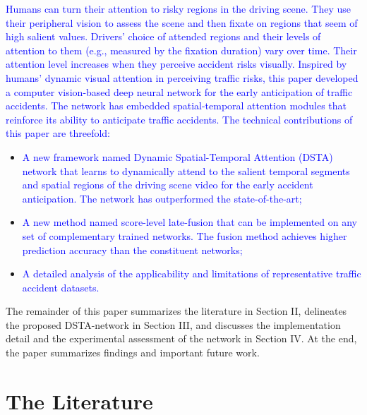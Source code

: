 \documentclass[journal]{IEEEtran}
\begin{document}
\textcolor{blue}{
Humans can turn their attention to risky regions in the driving scene. They use their peripheral vision to assess the scene and then fixate on regions that seem of high salient values. Drivers’ choice of attended regions and their levels of attention to them (e.g., measured by the fixation duration) vary over time. Their attention level increases when they perceive accident risks visually. Inspired by humans’ dynamic visual attention in perceiving traffic risks, this paper developed a computer vision-based deep neural network for the early anticipation of traffic accidents. The network has embedded spatial-temporal attention modules that reinforce its ability to anticipate traffic accidents. The technical contributions of this paper are threefold:}
\begin{itemize}
    \item \textcolor{blue}{A new framework named Dynamic Spatial-Temporal Attention (DSTA) network that learns to dynamically attend to the salient temporal segments and spatial regions of the driving scene video for the early accident anticipation. The network has outperformed the state-of-the-art;}
    \item \textcolor{blue}{A new method named score-level late-fusion that can be implemented on any set of complementary trained networks. The fusion method achieves higher prediction accuracy than the constituent networks;
    }
    \item \textcolor{blue}{A detailed analysis of the applicability and limitations of representative traffic accident datasets.}
\end{itemize}

The remainder of this paper summarizes the literature in Section II, delineates the proposed DSTA-network in Section III, and discusses the implementation detail and the experimental assessment of the network in Section IV. At the end, the paper summarizes findings and important future work.


\section{The Literature}
\end{document}
